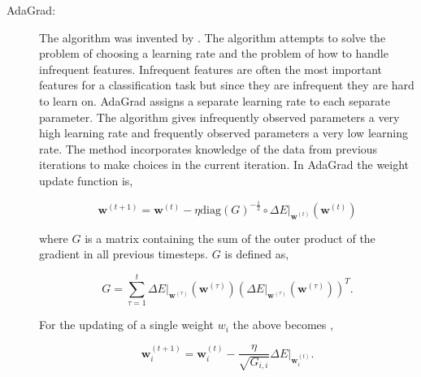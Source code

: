 \begin{description}

    \item[\gls{AdaGrad}:]

        The algorithm was invented by \cite{Duchi:2011:ASM:1953048.2021068}.
        The algorithm attempts to solve the problem of choosing a learning
        rate and the problem of how to handle infrequent features. Infrequent
        features are often the most important features for a classification task
        but since they are infrequent they are hard to learn on. \gls{AdaGrad}
        assigns a separate learning rate to each separate parameter. The
        algorithm gives infrequently observed parameters a very high learning
        rate and frequently observed parameters a very low learning rate. The
        method incorporates knowledge of the data from previous iterations to
        make choices in the current iteration. In \gls{AdaGrad} the weight
        update function is,

        \begin{equation}
            \mathbf{w}^{(t+1)} =
                \mathbf{w}^{(t)} -
                \eta \text{diag}(G)^{-\frac{1}{2}} \circ
                \Delta E|_{\mathbf{w}^{(t)}}\left(\mathbf{w}^{(t)}\right)
        \end{equation}

        where $G$ is a matrix containing the sum of the outer product of the
        gradient in all previous timesteps. $G$ is defined as,

        \begin{equation}
            G = \sum_{\tau=1}^t \Delta E|_{\mathbf{w}^{(\tau)}}\left(\mathbf{w}^{(\tau)}\right)
                \left(
                    \Delta E|_{\mathbf{w}^{(\tau)}}\left(\mathbf{w}^{(\tau)}\right)
                \right)^T.
        \end{equation}

        For the updating of a single weight $w_i$ the above becomes
        \cite{Duchi:2011:ASM:1953048.2021068},

        \begin{equation}
            \label{eq:individual_adagrad}
            \mathbf{w}_i^{(t+1)} =
                \mathbf{w}_i^{(t)} -
                \frac{\eta}{
                    \sqrt{G_{i,i}}
                } \Delta E|_{\mathbf{w}_i^{(t)}}.
        \end{equation}


\end{description}
